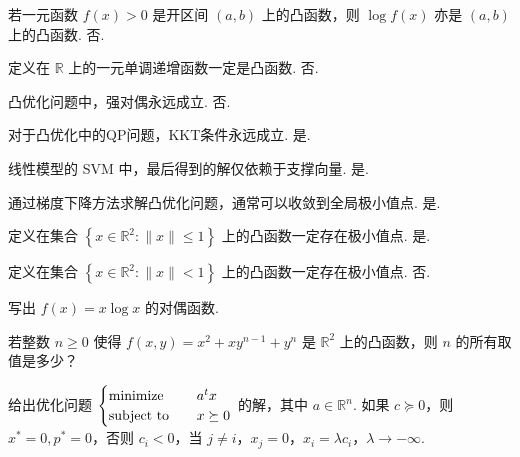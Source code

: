 \begin{problem}[判断]
    若一元函数 $f(x) > 0$ 是开区间 $(a, b)$ 上的凸函数，则 $\log f(x)$ 亦是 $(a, b)$ 上的凸函数.
    \Answer 否.
\end{problem}

\begin{problem}[判断]
    定义在 $\mathbb{R}$ 上的一元单调递增函数一定是凸函数.
    \Answer 否.
\end{problem}

\begin{problem}[判断]
    凸优化问题中，强对偶永远成立.
    \Answer 否.
\end{problem}

\begin{problem}[判断]
    对于凸优化中的QP问题，KKT条件永远成立.
    \Answer 是.
\end{problem}

\begin{problem}[判断]
    线性模型的 SVM 中，最后得到的解仅依赖于支撑向量.
    \Answer 是.
\end{problem}

\begin{problem}[判断]
    通过梯度下降方法求解凸优化问题，通常可以收敛到全局极小值点.
    \Answer 是.
\end{problem}

\begin{problem}[判断]
    定义在集合 $\left\{x \in \mathbb{R}^2: \|x\| \le 1\right\}$ 上的凸函数一定存在极小值点.
    \Answer 是.
\end{problem}

\begin{problem}[判断]
    定义在集合 $\left\{x \in \mathbb{R}^2: \|x\| < 1\right\}$ 上的凸函数一定存在极小值点.
    \Answer 否.
\end{problem}

\begin{problem}[问答]
    写出 $f(x) = x\log x$ 的对偶函数.
    \Answer 
\end{problem}

\begin{problem}[问答]
    若整数 $n \ge 0$ 使得 $f(x, y) = x^2 + xy^{n - 1} + y^n$ 是 $\mathbb{R}^2$ 上的凸函数，则 $n$ 的所有取值是多少？
    \Answer 
\end{problem}

\begin{problem}[问答]
    给出优化问题 $\begin{cases}
        \operatorname{minimize} \quad & a^tx\\
        \operatorname{subject\ to} \quad & x \succeq 0
    \end{cases}$ 的解，其中 $a\in \mathbb{R}^n$.
    \Answer 如果 $c \succeq 0$，则 $x^* = 0, p^* = 0$，否则 $c_i < 0$，当 $j \neq i$，$x_j = 0$，$x_i = \lambda c_i$，$\lambda \to -\infty$.
\end{problem}

